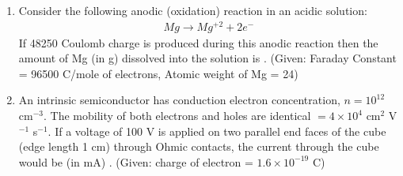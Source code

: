 \documentclass[a4paper,10pt]{article}
\begin{document}
\begin{enumerate}
    \item Consider the following anodic (oxidation) reaction in an acidic solution:
    \begin{align*}
        Mg \rightarrow Mg^{+2} + 2e^-
    \end{align*}
    If 48250 Coulomb charge is produced during this anodic reaction then the amount of Mg (in g) dissolved into the solution is \underline{\hspace{2cm}}.
    (Given: Faraday Constant = 96500 C/mole of electrons, Atomic weight of Mg = 24)
    \hfill{}
    \begin{enumerate}[label=\Alph*)]
    \end{enumerate}

    \item An intrinsic semiconductor has conduction electron concentration, $n = 10^{12}$ cm$^{-3}$. The mobility of both electrons and holes are identical $= 4 \times 10^4$ cm$^2$ V$^{-1}$ s$^{-1}$. If a voltage of 100 V is applied on two parallel end faces of the cube (edge length 1 cm) through Ohmic contacts, the current through the cube would be (in mA) \underline{\hspace{2cm}}.
    (Given: charge of electron = $1.6 \times 10^{-19}$ C)
    \hfill{}
    \begin{enumerate}[label=\Alph*)]
    \end{enumerate}


\end{enumerate}
\end{document}
